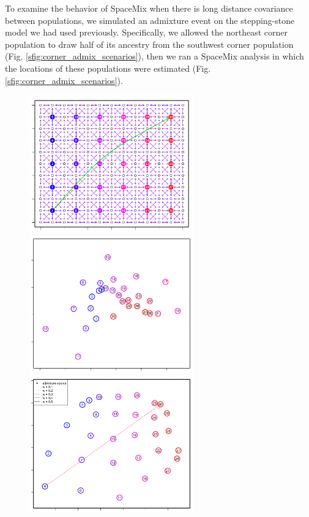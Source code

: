 \documentclass[12pt]{article}
\begin{document}
To examine the behavior of SpaceMix when there is long distance covariance between populations, we simulated an admixture event on the stepping-stone model we had used previously.  Specifically, we allowed the northeast corner population to draw half of its ancestry from the southwest corner population (Fig. \ref{sfig:corner_admix_scenarios}), then we ran a SpaceMix analysis in which the locations of these populations were estimated (Fig. \ref{sfig:corner_admix_scenarios}).

\begin{figure}
	\centering
			{\includegraphics[width=2.8in,height=2.33in]{figs/sims/corner_admixture_lattice.png}}
			{\includegraphics[width=2.8in,height=2.33in]{figs/sims/GeoGenMap_corner_admixture_CYOL.pdf}}
			{\includegraphics[width=2.8in,height=2.33in]{figs/sims/GeoGenMap_corner_admixture.png}}

\end{figure}
\end{document}
